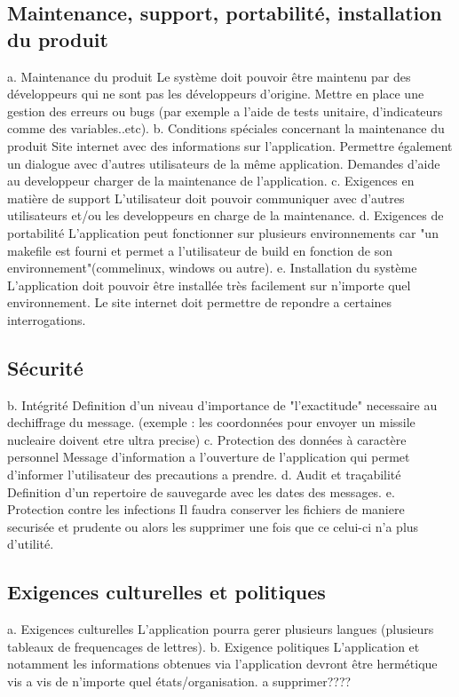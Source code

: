\documentclass[a4]{article}
\begin{document}
		\subsection{Maintenance, support, portabilité, installation du produit}
			a. Maintenance du produit
Le système doit pouvoir être maintenu par des développeurs qui ne sont pas les
développeurs d’origine.
Mettre en place une gestion des erreurs ou bugs (par exemple a l'aide de tests unitaire, d'indicateurs comme des variables..etc).
			b. Conditions spéciales concernant la maintenance du produit
Site internet avec des informations sur l'application.
Permettre également un dialogue avec d'autres utilisateurs de la même application.
Demandes d'aide au developpeur charger de la maintenance de l'application.
			c. Exigences en matière de support
L'utilisateur doit pouvoir communiquer avec d'autres utilisateurs et/ou les developpeurs en charge de la maintenance.
			d. Exigences de portabilité
L'application peut fonctionner sur plusieurs environnements car "un makefile est fourni et permet a l'utilisateur de build en fonction de son environnement"(commelinux, windows ou autre).
			e. Installation du système
L'application doit pouvoir être installée très facilement sur n'importe quel environnement.
Le site internet doit permettre de repondre a certaines interrogations.
		\subsection{Sécurité}
			b. Intégrité
Definition d'un niveau d'importance de "l'exactitude" necessaire au dechiffrage du message.
(exemple : les coordonnées pour envoyer un missile nucleaire doivent etre ultra precise)
			c. Protection des données à caractère personnel
Message d'information a l'ouverture de l'application qui permet d'informer l'utilisateur des precautions a prendre.
			d. Audit et traçabilité
Definition d'un repertoire de sauvegarde avec les dates des messages.
			e. Protection contre les infections
Il faudra conserver les fichiers de maniere securisée et prudente ou alors les supprimer une fois que ce celui-ci n'a plus d'utilité.
		\subsection{Exigences culturelles et politiques}
			a. Exigences culturelles
L'application pourra gerer plusieurs langues (plusieurs tableaux de frequencages de lettres).
			b. Exigence politiques
L'application et notamment les informations obtenues via l'application devront être hermétique vis a vis de n'importe quel états/organisation. a supprimer????
\end{document}

